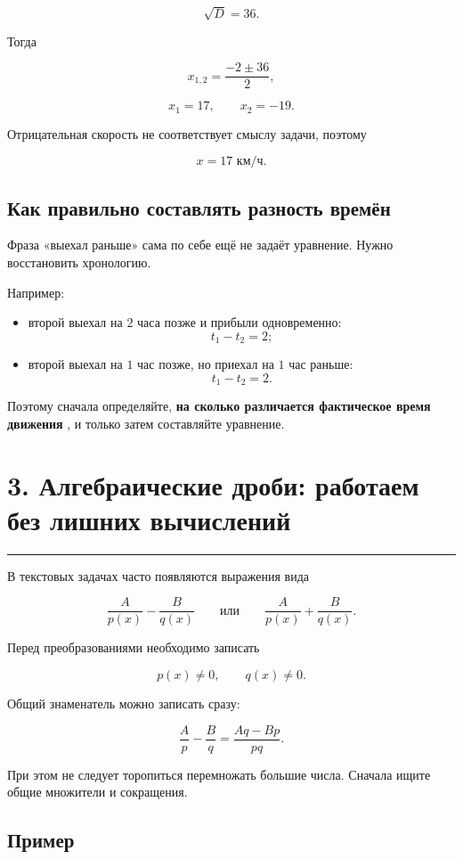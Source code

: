 \documentclass[a4paper,12pt]{article}
\newcommand{\checksection}[1]{%
  \section*{\color{darkaccent}#1}
  \vspace{-0.6em}
  {\color{accent!70}\rule{\linewidth}{0.6pt}}
  \vspace{0.35em}
}
\newcommand{\keyidea}[1]{%
  \textcolor{darkaccent}{\textbf{#1}}
}
\begin{document}
\[
\sqrt D=36.
\]

Тогда

\[
x_{1,2}=\frac{-2\pm36}{2},
\]

\[
x_1=17,\qquad x_2=-19.
\]

Отрицательная скорость не соответствует смыслу задачи, поэтому

\[
\boxed{x=17\text{ км/ч}}.
\]

\subsection*{\color{darkaccent}Как правильно составлять разность времён}

Фраза «выехал раньше» сама по себе ещё не задаёт уравнение. Нужно восстановить хронологию.

Например:

\begin{itemize}
  \item второй выехал на \(2\) часа позже и прибыли одновременно:
  \[
  t_1-t_2=2;
  \]

  \item второй выехал на \(1\) час позже, но приехал на \(1\) час раньше:
  \[
  t_1-t_2=2.
  \]
\end{itemize}

Поэтому сначала определяйте, \keyidea{на сколько различается фактическое время движения}, и только затем составляйте уравнение.


\checksection{3. Алгебраические дроби: работаем без лишних вычислений}

В текстовых задачах часто появляются выражения вида

\[
\frac{A}{p(x)}-\frac{B}{q(x)}
\qquad\text{или}\qquad
\frac{A}{p(x)}+\frac{B}{q(x)}.
\]

Перед преобразованиями необходимо записать

\[
p(x)\ne0,\qquad q(x)\ne0.
\]

Общий знаменатель можно записать сразу:

\[
\frac{A}{p}-\frac{B}{q}
=
\frac{Aq-Bp}{pq}.
\]

При этом не следует торопиться перемножать большие числа. Сначала ищите общие множители и сокращения.

\subsection*{\color{darkaccent}Пример}
\end{document}

